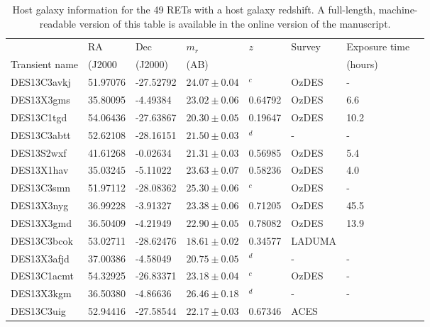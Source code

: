 \documentclass[fleqn,usenatbib,]{mnras}
\begin{document}
\begin{table}
\caption{Host galaxy information for the 49 RETs with a host galaxy redshift. A full-length, machine-readable version of this table is available in the online version of the manuscript.}

\begin{threeparttable}
\begin{tabular}{llllllll}

\toprule
{} &       RA &       Dec &    $m_r$\tnote{a}  &     $z$ &     Survey & Exposure time \tnote{b} \\
Transient name &  (J2000  & (J2000)  &  (AB)    &         &         &   (hours)         &               \\
\midrule
DES13C3avkj    & 51.97076 & -27.52792 & $24.07 \pm 0.04$ &    $^c$ &      OzDES &             - \\
DES13X3gms     & 35.80095 &  -4.49384 & $23.02 \pm 0.06$ & 0.64792 &      OzDES &       6.6 \\
DES13C1tgd     & 54.06436 & -27.63867 & $20.30 \pm 0.05$ & 0.19647 &      OzDES &      10.2 \\
DES13C3abtt    & 52.62108 & -28.16151 & $21.50 \pm 0.03$ &    $^d$ &          - &             - \\
DES13S2wxf     & 41.61268 &  -0.02634 & $21.31 \pm 0.03$ & 0.56985 &      OzDES &       5.4 \\
DES13X1hav     & 35.03245 &  -5.11022 & $23.63 \pm 0.07$ & 0.58236 &      OzDES &       4.0 \\
DES13C3smn     & 51.97112 & -28.08362 & $25.30 \pm 0.06$ &    $^c$ &      OzDES &             - \\
DES13X3nyg     & 36.99228 &  -3.91327 & $23.38 \pm 0.06$ & 0.71205 &      OzDES &      45.5 \\
DES13X3gmd     & 36.50409 &  -4.21949 & $22.90 \pm 0.05$ & 0.78082 &      OzDES &      13.9 \\
DES13C3bcok    & 53.02711 & -28.62476 & $18.61 \pm 0.02$ & 0.34577 &  LADUMA &               \\
DES13X3afjd    & 37.00386 &  -4.58049 & $20.75 \pm 0.05$ &    $^d$ &          - &             - \\
DES13C1acmt    & 54.32925 & -26.83371 & $23.18 \pm 0.04$ &    $^c$ &      OzDES &             - \\
DES13X3kgm     & 36.50380 &  -4.86636 & $26.46 \pm 0.18$ &    $^d$ &          - &             - \\
DES13C3uig     & 52.94416 & -27.58544 & $22.17 \pm 0.03$ & 0.67346 &       ACES &               \\

\end{tabular}
\end{threeparttable}
\end{table}
\end{document}
